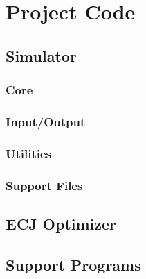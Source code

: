 %
%

\chapter{Project Code}\label{appa:code}

\section{Simulator}
\subsection{Core}

\newpage

\newpage

\newpage

\newpage

\newpage

\newpage

\newpage

\newpage

\subsection{Input/Output}

\newpage

\subsection{Utilities}

\newpage

\newpage

\newpage

\newpage

\newpage

\newpage

\newpage

\subsection{Support Files}

\newpage

\newpage

\newpage

\section{ECJ Optimizer}

\newpage

\newpage

\section{Support Programs}



